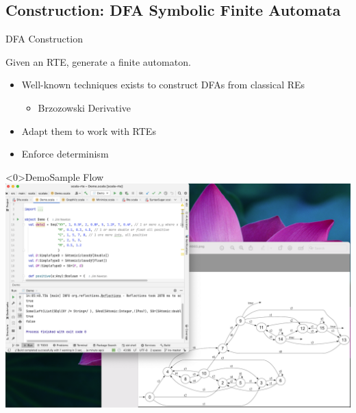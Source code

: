 \subsection{Construction: DFA Symbolic Finite Automata}

{  
\begin{frame}{ DFA Construction}

  Given an RTE, generate a finite automaton.

  \begin{itemize}
  \item Well-known techniques exists to construct DFAs from classical REs
    \begin{itemize}
      \item Brzozowski Derivative
  \end{itemize}
  \item Adapt them to work with RTEs
  \item Enforce determinism
  \end{itemize}
\end{frame}
}



\begin{frame}<0>{Demo}{Sample Flow}
   \includegraphics[height=0.8\textheight]{demo.png}
\end{frame}

